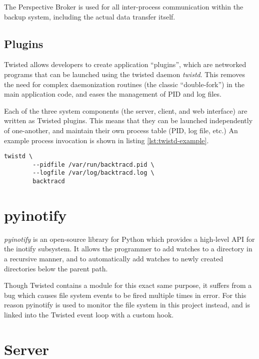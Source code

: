 The Perspective Broker is used for all inter-process communication within the
backup system, including the actual data transfer itself.

\subsection{Plugins}
\label{sec:twisted-plugins}

Twisted allows developers to create application ``plugins'', which are
networked programs that can be launched using the twisted daemon \emph{twistd}.
This removes the need for complex daemonization routines (the classic
``double-fork'') in the main application code, and eases the management of PID
and log files.

Each of the three system components (the server, client, and web interface) are
written as Twisted plugins. This means that they can be launched independently
of one-another, and maintain their own process table (PID, log file, etc.) An
example process invocation is shown in listing \ref{lst:twistd-example}.

\begin{singlespacing}
\begin{lstlisting}[caption=An example twistd invocation,
    label=lst:twistd-example]
    twistd \
        --pidfile /var/run/backtracd.pid \
        --logfile /var/log/backtracd.log \
        backtracd
\end{lstlisting}
\end{singlespacing}

\section{pyinotify}

\emph{pyinotify} is an open-source library for Python which provides
a high-level API for the inotify subsystem. It allows the programmer to add
watches to a directory in a recursive manner, and to automatically add watches
to newly created directories below the parent path.

Though Twisted contains a module for this exact same purpose, it suffers from
a bug which causes file system events to be fired multiple times in error. For
this reason pyinotify is used to monitor the file system in this project
instead, and is linked into the Twisted event loop with a custom hook.

\section{Server}


